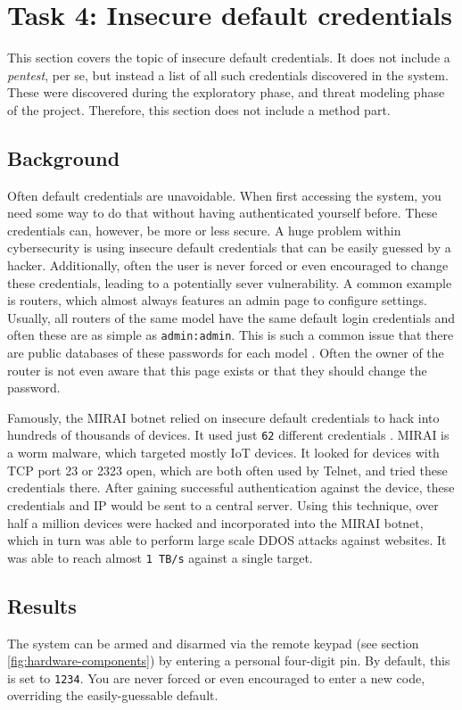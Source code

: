 \section{Task 4: Insecure default credentials}
This section covers the topic of insecure default credentials. It does not include a \textit{pentest}, per se, but instead a list of all such credentials discovered in the system. These were discovered during the exploratory phase, and threat modeling phase of the project. Therefore, this section does not include a method part.

\subsection{Background}
Often default credentials are unavoidable. When first accessing the system, you need some way to do that without having authenticated yourself before. These credentials can, however, be more or less secure. A huge problem within cybersecurity is using insecure default credentials that can be easily guessed by a hacker. Additionally, often the user is never forced or even encouraged to change these credentials, leading to a potentially sever vulnerability. A common example is routers, which almost always features an admin page to configure settings. Usually, all routers of the same model have the same default login credentials and often these are as simple as \texttt{admin:admin}. This is such a common issue that there are public databases of these passwords for each model . Often the owner of the router is not even aware that this page exists or that they should change the password.

Famously, the MIRAI botnet relied on insecure default credentials to hack into hundreds of thousands of devices. It used just \texttt{62} different credentials \cite{understanding-mirai}. MIRAI is a worm malware, which targeted mostly IoT devices. It looked for devices with TCP port 23 or 2323 open, which are both often used by Telnet, and tried these credentials there. After gaining successful authentication against the device, these credentials and IP would be sent to a central server. Using this technique, over half a million devices were hacked and incorporated into the MIRAI botnet, which in turn was able to perform large scale DDOS attacks against websites. It was able to reach almost \texttt{1 TB/s} against a single target.

\subsection{Results}
The system can be armed and disarmed via the remote keypad (see section \ref{fig:hardware-components}) by entering a personal four-digit pin. By default, this is set to \texttt{1234}. You are never forced or even encouraged to enter a new code, overriding the easily-guessable default.

